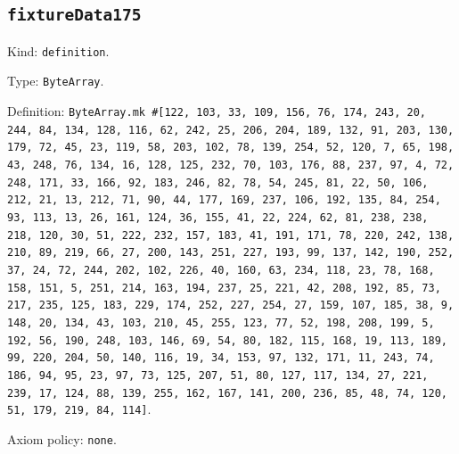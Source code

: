 \documentclass[11pt]{article}
\begin{document}
\subsection*{\texttt{fixtureData175}}
\noindent Kind: \texttt{definition}.\par
\noindent Type: \texttt{ByteArray}.\par
\noindent Definition: \texttt{ByteArray.mk \#[122, 103, 33, 109, 156, 76, 174, 243, 20, 244, 84, 134, 128, 116, 62, 242, 25, 206, 204, 189, 132, 91, 203, 130, 179, 72, 45, 23, 119, 58, 203, 102, 78, 139, 254, 52, 120, 7, 65, 198, 43, 248, 76, 134, 16, 128, 125, 232, 70, 103, 176, 88, 237, 97, 4, 72, 248, 171, 33, 166, 92, 183, 246, 82, 78, 54, 245, 81, 22, 50, 106, 212, 21, 13, 212, 71, 90, 44, 177, 169, 237, 106, 192, 135, 84, 254, 93, 113, 13, 26, 161, 124, 36, 155, 41, 22, 224, 62, 81, 238, 238, 218, 120, 30, 51, 222, 232, 157, 183, 41, 191, 171, 78, 220, 242, 138, 210, 89, 219, 66, 27, 200, 143, 251, 227, 193, 99, 137, 142, 190, 252, 37, 24, 72, 244, 202, 102, 226, 40, 160, 63, 234, 118, 23, 78, 168, 158, 151, 5, 251, 214, 163, 194, 237, 25, 221, 42, 208, 192, 85, 73, 217, 235, 125, 183, 229, 174, 252, 227, 254, 27, 159, 107, 185, 38, 9, 148, 20, 134, 43, 103, 210, 45, 255, 123, 77, 52, 198, 208, 199, 5, 192, 56, 190, 248, 103, 146, 69, 54, 80, 182, 115, 168, 19, 113, 189, 99, 220, 204, 50, 140, 116, 19, 34, 153, 97, 132, 171, 11, 243, 74, 186, 94, 95, 23, 97, 73, 125, 207, 51, 80, 127, 117, 134, 27, 221, 239, 17, 124, 88, 139, 255, 162, 167, 141, 200, 236, 85, 48, 74, 120, 51, 179, 219, 84, 114]}.\par
\noindent Axiom policy: \texttt{none}.\par
\end{document}
